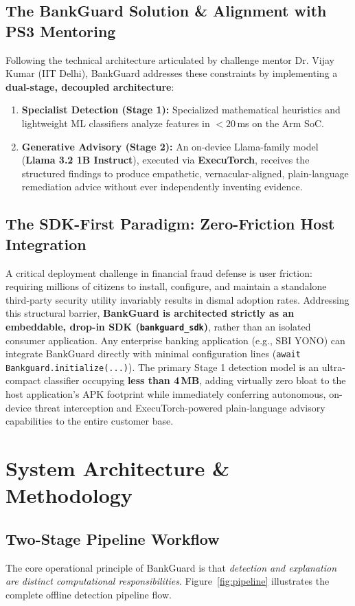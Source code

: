 \documentclass[11pt,a4paper]{article}
\begin{document}
\subsection{The BankGuard Solution \& Alignment with PS3 Mentoring}
Following the technical architecture articulated by challenge mentor Dr. Vijay Kumar (IIT Delhi), BankGuard addresses these constraints by implementing a \textbf{dual-stage, decoupled architecture}:
\begin{enumerate}
    \item \textbf{Specialist Detection (Stage 1):} Specialized mathematical heuristics and lightweight ML classifiers analyze features in $<20$\,ms on the Arm SoC.
    \item \textbf{Generative Advisory (Stage 2):} An on-device Llama-family model (\textbf{Llama 3.2 1B Instruct}), executed via \textbf{ExecuTorch}, receives the structured findings to produce empathetic, vernacular-aligned, plain-language remediation advice without ever independently inventing evidence.
\end{enumerate}

\subsection{The SDK-First Paradigm: Zero-Friction Host Integration}
A critical deployment challenge in financial fraud defense is user friction: requiring millions of citizens to install, configure, and maintain a standalone third-party security utility invariably results in dismal adoption rates. Addressing this structural barrier, \textbf{BankGuard is architected strictly as an embeddable, drop-in SDK (\texttt{bankguard\_sdk})}, rather than an isolated consumer application. Any enterprise banking application (e.g., SBI YONO) can integrate BankGuard directly with minimal configuration lines (\texttt{await Bankguard.initialize(...)}). The primary Stage 1 detection model is an ultra-compact classifier occupying \textbf{less than 4\,MB}, adding virtually zero bloat to the host application's APK footprint while immediately conferring autonomous, on-device threat interception and ExecuTorch-powered plain-language advisory capabilities to the entire customer base.

\section{System Architecture \& Methodology}

\subsection{Two-Stage Pipeline Workflow}
The core operational principle of BankGuard is that \textit{detection and explanation are distinct computational responsibilities}. Figure~\ref{fig:pipeline} illustrates the complete offline detection pipeline flow.
\end{document}
